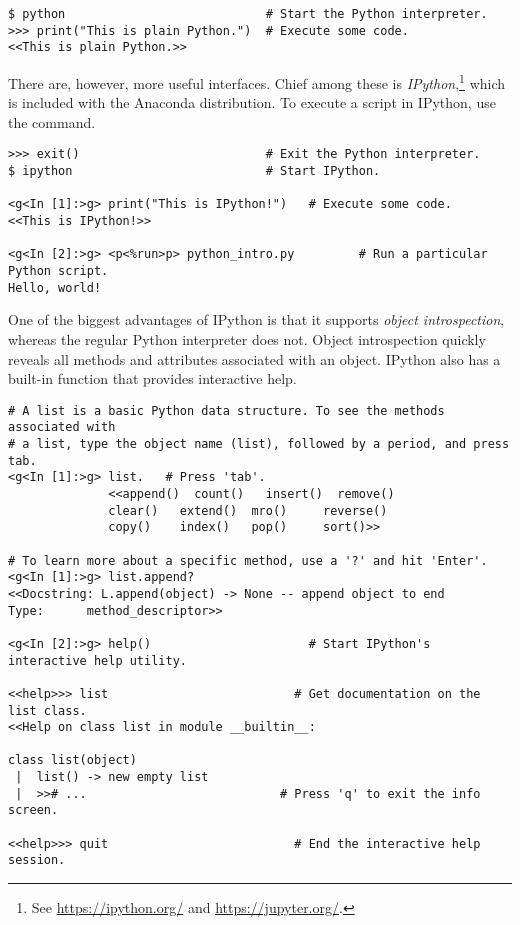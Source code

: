 \begin{lstlisting}
$ python                            # Start the Python interpreter.
>>> print("This is plain Python.")  # Execute some code.
<<This is plain Python.>>
\end{lstlisting}

There are, however, more useful interfaces.
Chief among these is \emph{IPython},\footnote{See \url{https://ipython.org/} and \url{https://jupyter.org/}.} \cite{PER-GRA:2007,jupyter} which is included with the Anaconda distribution.
To execute a script in IPython, use the  command.

\begin{lstlisting}
>>> exit()                          # Exit the Python interpreter.
$ ipython                           # Start IPython.

<g<In [1]:>g> print("This is IPython!")   # Execute some code.
<<This is IPython!>>

<g<In [2]:>g> <p<%run>p> python_intro.py         # Run a particular Python script.
Hello, world!
\end{lstlisting}

One of the biggest advantages of IPython is that it supports \emph{object introspection}, whereas the regular Python interpreter does not.
Object introspection quickly reveals all methods and attributes associated with an object.
IPython also has a built-in  function that provides interactive help.

\begin{lstlisting}
# A list is a basic Python data structure. To see the methods associated with
# a list, type the object name (list), followed by a period, and press tab.
<g<In [1]:>g> list.   # Press 'tab'.
              <<append()  count()   insert()  remove()
              clear()   extend()  mro()     reverse()
              copy()    index()   pop()     sort()>>

# To learn more about a specific method, use a '?' and hit 'Enter'.
<g<In [1]:>g> list.append?
<<Docstring: L.append(object) -> None -- append object to end
Type:      method_descriptor>>

<g<In [2]:>g> help()                      # Start IPython's interactive help utility.

<<help>>> list                          # Get documentation on the list class.
<<Help on class list in module __builtin__:

class list(object)
 |  list() -> new empty list
 |  >># ...                           # Press 'q' to exit the info screen.

<<help>>> quit                          # End the interactive help session.
\end{lstlisting}

